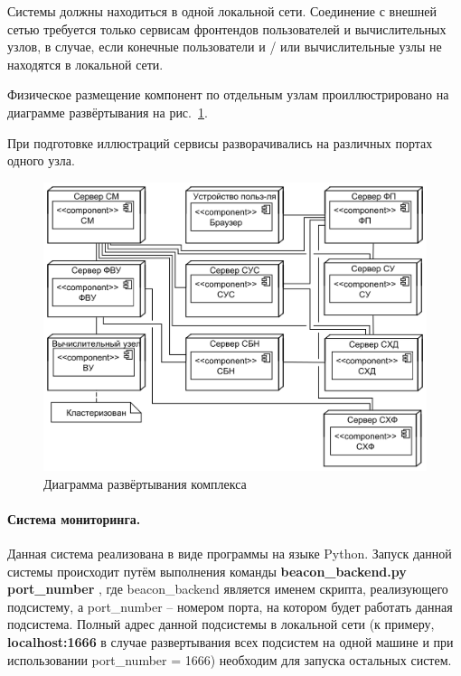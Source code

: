 \documentclass[a4paper,12pt]{report}
\numberwithin{equation}{section}
\begin{document}
  Системы должны находиться в одной локальной сети. 
  Соединение с внешней сетью требуется только сервисам фронтендов пользователей и вычислительных узлов, 
  в случае, если конечные пользователи и / или вычислительные узлы не находятся в локальной сети.
  
  Физическое размещение компонент по отдельным узлам проиллюстрировано на диаграмме развёртывания на рис.~\ref{fig:depl-common}.
  
  При подготовке иллюстраций сервисы разворачивались на различных портах одного узла.
  
  \begin{figure}
    \centering
    \includegraphics[width=\linewidth]{diagrams/common/deployment}
    \caption{Диаграмма развёртывания комплекса}
    \label{fig:depl-common}
  \end{figure}
  
  
  \paragraph{Система мониторинга.}
  Данная система реализована в виде программы на языке Python.
  Запуск данной системы происходит путём выполнения команды 
  \textbf{ beacon\_backend.py port\_number }
  , где beacon\_backend является именем скрипта, реализующего подсистему, 
  а port\_number -- номером порта, на котором будет работать данная подсистема.
  Полный адрес данной подсистемы в локальной сети (к примеру, 
  \textbf{localhost:1666} в случае развертывания всех подсистем на одной машине 
  и при использовании port\_number = 1666)
  необходим для запуска остальных систем.  
  
\end{document}
